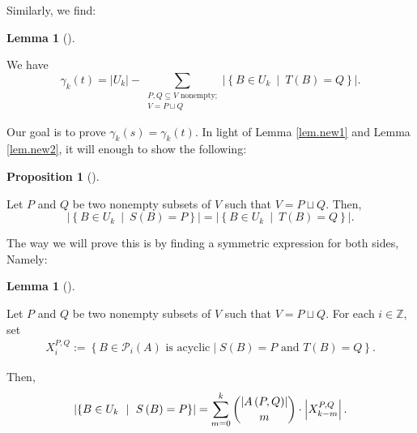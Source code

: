 \documentclass[numbers=enddot,12pt,final,onecolumn,notitlepage]{scrartcl}%
\theoremstyle{definition}
\newtheorem{lem}[theo]{Lemma}
\newenvironment{lemma}[1][]
{\begin{lem}[#1]\begin{leftbar}}
{\end{leftbar}\end{lem}}
\newtheorem{prop}[theo]{Proposition}
\newenvironment{proposition}[1][]
{\begin{prop}[#1]\begin{leftbar}}
{\end{leftbar}\end{prop}}
\let\sumnonlimits\sum
\renewcommand{\sum}{\sumnonlimits\limits}
\theoremstyle{plainsl}
\begin{document}
Similarly, we find:

\begin{lemma}
\label{lem.new2}We have%
\[
\gamma_{k}\left(  t\right)  =\left\vert U_{k}\right\vert -\sum
_{\substack{P,Q\subseteq V\text{ nonempty;}\\V=P\sqcup Q}}\left\vert \left\{
B\in U_{k}\ \mid\ T\left(  B\right)  =Q\right\}  \right\vert .
\]

\end{lemma}

Our goal is to prove $\gamma_{k}\left(  s\right)  =\gamma_{k}\left(  t\right)
$. In light of Lemma \ref{lem.new1} and Lemma \ref{lem.new2}, it will enough
to show the following:

\begin{proposition}
\label{prop.new3}Let $P$ and $Q$ be two nonempty subsets of $V$ such that
$V=P\sqcup Q$. Then,%
\[
\left\vert \left\{  B\in U_{k}\ \mid\ S\left(  B\right)  =P\right\}
\right\vert =\left\vert \left\{  B\in U_{k}\ \mid\ T\left(  B\right)
=Q\right\}  \right\vert .
\]

\end{proposition}

The way we will prove this is by finding a symmetric expression for both
sides, Namely:

\begin{lemma}
\label{lem.new4}Let $P$ and $Q$ be two nonempty subsets of $V$ such that
$V=P\sqcup Q$.
For each $i \in \mathbb{Z}$, set
\begin{align*}
    X_i^{P,Q} := \left\{B \in \mathcal{P}_i(A) \text{ is acyclic} \mid S(B) = P \text{ and } T(B) = Q\right\}.
\end{align*}


Then,%
\[
\left\vert \left\{  B\in U_{k}\ \mid\ S\left(  B\right)  =P\right\}
\right\vert =\sum_{m=0}^{k}\dbinom{\left\vert A\left(  P,Q\right)  \right\vert
}{m}\cdot\left\vert X_{k-m}^{P,Q}\right\vert .
\]

\end{lemma}
\end{document}
